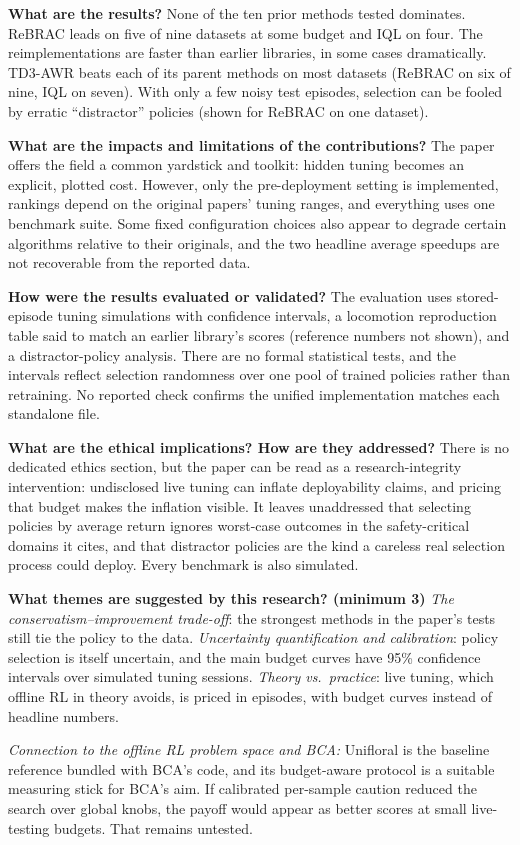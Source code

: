 \documentclass[11pt]{article}
\newcommand{\q}[2]{\item \textbf{#1} #2}
\newcommand{\tiein}[1]{\par\smallskip\noindent\emph{Connection to the offline RL problem space and BCA:} #1\par\medskip}
\begin{document}
\begin{qna}
\q{What are the results?}
None of the ten prior methods tested dominates. ReBRAC leads on five of nine datasets at some budget and IQL on four. The reimplementations are faster than earlier libraries, in some cases dramatically. TD3-AWR beats each of its parent methods on most datasets (ReBRAC on six of nine, IQL on seven). With only a few noisy test episodes, selection can be fooled by erratic ``distractor'' policies (shown for ReBRAC on one dataset).

\q{What are the impacts and limitations of the contributions?}
The paper offers the field a common yardstick and toolkit: hidden tuning becomes an explicit, plotted cost. However, only the pre-deployment setting is implemented, rankings depend on the original papers' tuning ranges, and everything uses one benchmark suite. Some fixed configuration choices also appear to degrade certain algorithms relative to their originals, and the two headline average speedups are not recoverable from the reported data.

\q{How were the results evaluated or validated?}
The evaluation uses stored-episode tuning simulations with confidence intervals, a locomotion reproduction table said to match an earlier library's scores (reference numbers not shown), and a distractor-policy analysis. There are no formal statistical tests, and the intervals reflect selection randomness over one pool of trained policies rather than retraining. No reported check confirms the unified implementation matches each standalone file.

\q{What are the ethical implications? How are they addressed?}
There is no dedicated ethics section, but the paper can be read as a research-integrity intervention: undisclosed live tuning can inflate deployability claims, and pricing that budget makes the inflation visible. It leaves unaddressed that selecting policies by average return ignores worst-case outcomes in the safety-critical domains it cites, and that distractor policies are the kind a careless real selection process could deploy. Every benchmark is also simulated.

\q{What themes are suggested by this research? (minimum 3)}
\emph{The conservatism--improvement trade-off}: the strongest methods in the paper's tests still tie the policy to the data. \emph{Uncertainty quantification and calibration}: policy selection is itself uncertain, and the main budget curves have 95\% confidence intervals over simulated tuning sessions. \emph{Theory vs.\ practice}: live tuning, which offline RL in theory avoids, is priced in episodes, with budget curves instead of headline numbers.

\end{qna}
\tiein{Unifloral is the baseline reference bundled with BCA's code, and its budget-aware protocol is a suitable measuring stick for BCA's aim. If calibrated per-sample caution reduced the search over global knobs, the payoff would appear as better scores at small live-testing budgets. That remains untested.}
\end{document}
